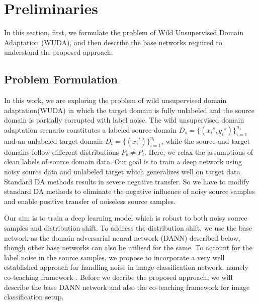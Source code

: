 \section{Preliminaries}

In this section, first, we formulate the problem of Wild Unsupervised Domain Adaptation (WUDA), and then describe the base networks required to understand the proposed approach.

\subsection{Problem Formulation}
In this work, we are exploring the problem of wild unsupervised domain adaptation(WUDA) in which the target domain is fully unlabeled and the source domain is partially corrupted with label noise. The wild unsupervised domain adaptation scenario constitutes a labeled source domain ${D}_s = \{({x_i}^s, {y_i}^s)\}_{i=1}^{n_s}$ and an unlabeled target domain ${D}_t = \{({x_i}^t)\}_{i=1}^{n_t}$, while the source and target domains follow different distributions $P_s \neq P_t$. Here, we relax the assumptions of clean labels of source domain data.  Our goal is to train a deep network using noisy source data and unlabeled target which generalizes well on target data. Standard DA methods results in severe negative transfer. So we have to modify standard DA methods to eliminate the negative influence of noisy source samples and enable positive transfer of noiseless source samples.

Our aim is to train a deep learning model which is robust to both noisy source samples and distribution shift. 
To address the distribution shift, we use the base network as the domain adversarial neural network (DANN) described below, though other base networks can also be utilised for the same.
To account for the label noise in the source samples, we propose to incorporate a very well established approach for handling noise in image classification network, namely co-teaching framework \cite{coteaching}.
Before we decribe the proposed approach, we will describe the base DANN network and also the co-teaching framework for image classification setup.

